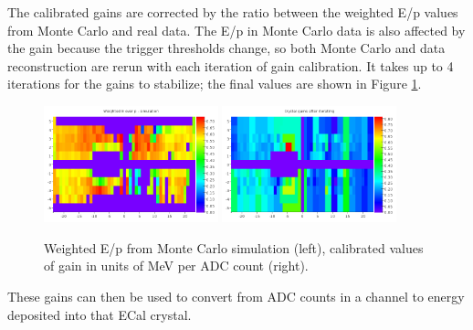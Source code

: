 The calibrated gains are corrected by the ratio between the weighted E/p values from Monte Carlo and real data.
The E/p in Monte Carlo data is also affected by the gain because the trigger thresholds change, so both Monte Carlo and data reconstruction are rerun with each iteration of gain calibration.
It takes up to 4 iterations for the gains to stabilize; the final values are shown in Figure \ref{fig:gains}.
\begin{figure}[ht]
	\includegraphics[width=0.45\textwidth]{test2012/ecalperformance/ecalgainplots_corr_sim}
	\includegraphics[width=0.45\textwidth]{test2012/ecalperformance/gains}
	\caption{\small{Weighted E/p from Monte Carlo simulation (left), calibrated values of gain in units of MeV per ADC count (right).}}
	\label{fig:gains}
\end{figure}
These gains can then be used to convert from ADC counts in a channel to energy deposited into that ECal crystal.

\vspace{1cm}{\bf Trigger performance}

